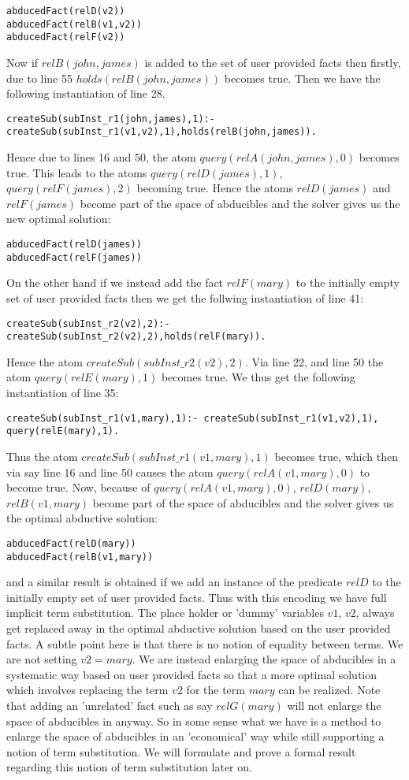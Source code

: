 \documentclass[sigconf]{acmart}
\begin{document}
\begin{verbatim}
abducedFact(relD(v2)) 
abducedFact(relB(v1,v2)) 
abducedFact(relF(v2))    
\end{verbatim}
Now if $relB(john,james)$ is added to the set of user provided facts then firstly, due to line 55 $holds(relB(john,james))$ becomes true. Then we have the following instantiation of line 28.
\begin{verbatim}
createSub(subInst_r1(john,james),1):-createSub(subInst_r1(v1,v2),1),holds(relB(john,james)). 
\end{verbatim}
Hence due to lines 16 and 50, the atom $query(relA(john,james),0)$ becomes true. This leads to the atoms $query(relD(james),1)$, $query(relF(james),2)$ becoming true. Hence the atoms $relD(james)$ and $relF(james)$ become part of the space of abducibles and the solver gives us the new optimal solution:
\begin{verbatim}
abducedFact(relD(james)) 
abducedFact(relF(james)) 
\end{verbatim}
On the other hand if we instead add the fact $relF(mary)$ to the initially empty set of user provided facts then we get the follwing instantiation of line 41:
\begin{verbatim}
createSub(subInst_r2(v2),2):-createSub(subInst_r2(v2),2),holds(relF(mary)).    
\end{verbatim}
Hence the atom $createSub(subInst\_r2(v2),2)$. Via line 22, and line 50 the atom $query(relE(mary),1)$ becomes true. We thus get the following instantiation of line 35:
\begin{verbatim}
createSub(subInst_r1(v1,mary),1):- createSub(subInst_r1(v1,v2),1), query(relE(mary),1).   
\end{verbatim}
Thus the atom $createSub(subInst\_r1(v1,mary),1)$ becomes true, which then via say line 16 and line 50 causes the atom $query(relA(v1,mary),0)$ to become true. Now, because of $query(relA(v1,mary),0)$, $relD(mary)$, $relB(v1,mary)$ become part of the space of abducibles and the solver gives us the optimal abductive solution: 
\begin{verbatim}
abducedFact(relD(mary)) 
abducedFact(relB(v1,mary))
\end{verbatim}
and a similar result is obtained if we add an instance of the predicate $relD$
to the initially empty set of user provided facts. Thus with this encoding we
have full implicit term substitution. The place holder or 'dummy' variables
$v1$, $v2$, always get replaced away in the optimal abductive solution based
on the user provided facts. A subtle point here is that there is no notion of
equality between terms. We are not setting $v2 = mary$. We are instead
enlarging the space of abducibles in a systematic way based on user provided
facts so that a more optimal solution which involves replacing the term $v2$
for the term $mary$ can be realized. Note that adding an 'unrelated' fact such
as say $relG(mary)$ will not enlarge the space of abducibles in anyway. So in
some sense what we have is a method to enlarge the space of abducibles in an
'economical' way while still supporting a notion of term substitution. We will
formulate and prove a formal result regarding this notion of term substitution
later on.
\end{document}
